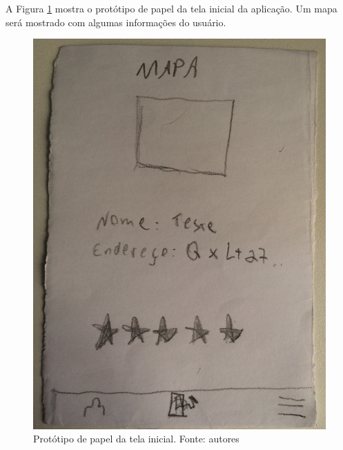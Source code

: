 A Figura \ref{img:prototipo_de_papel_tela_incial} mostra o protótipo de papel da tela inicial da aplicação. Um mapa será mostrado com algumas informações do usuário.
\begin{figure}[H]
    \centering
    \includegraphics[scale=0.1, angle=-90]{figuras/prototipo_papel_inicial.jpg}
    \caption[Protótipo de papel da tela inicial]{Protótipo de papel da tela inicial. Fonte: autores}
    \label{img:prototipo_de_papel_tela_incial}
\end{figure}
 \pagebreak

